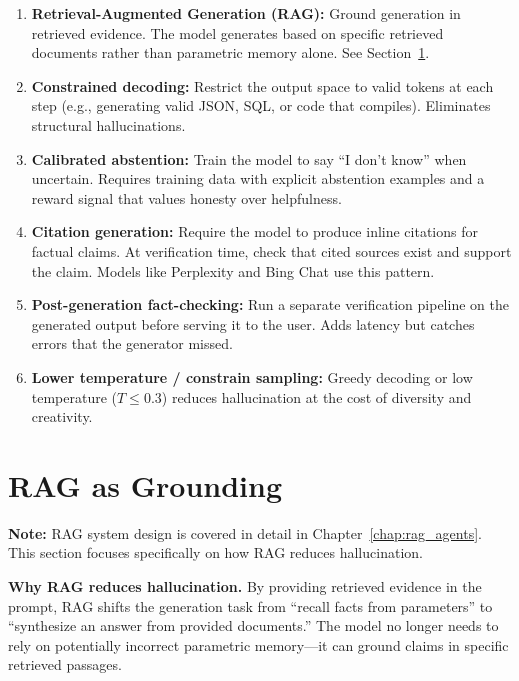 \begin{enumerate}
    \item \textbf{Retrieval-Augmented Generation (RAG):} Ground generation in retrieved evidence. The model generates based on specific retrieved documents rather than parametric memory alone. See Section~\ref{sec:rag_grounding}.

    \item \textbf{Constrained decoding:} Restrict the output space to valid tokens at each step (e.g., generating valid JSON, SQL, or code that compiles). Eliminates structural hallucinations.

    \item \textbf{Calibrated abstention:} Train the model to say ``I don't know'' when uncertain. Requires training data with explicit abstention examples and a reward signal that values honesty over helpfulness.

    \item \textbf{Citation generation:} Require the model to produce inline citations for factual claims. At verification time, check that cited sources exist and support the claim. Models like Perplexity and Bing Chat use this pattern.

    \item \textbf{Post-generation fact-checking:} Run a separate verification pipeline on the generated output before serving it to the user. Adds latency but catches errors that the generator missed.

    \item \textbf{Lower temperature / constrain sampling:} Greedy decoding or low temperature ($T \leq 0.3$) reduces hallucination at the cost of diversity and creativity.
\end{enumerate}

\section{RAG as Grounding}
\label{sec:rag_grounding}

\textbf{Note:} RAG system design is covered in detail in Chapter~\ref{chap:rag_agents}. This section focuses specifically on how RAG reduces hallucination.

\textbf{Why RAG reduces hallucination.} By providing retrieved evidence in the prompt, RAG shifts the generation task from ``recall facts from parameters'' to ``synthesize an answer from provided documents.'' The model no longer needs to rely on potentially incorrect parametric memory---it can ground claims in specific retrieved passages.

